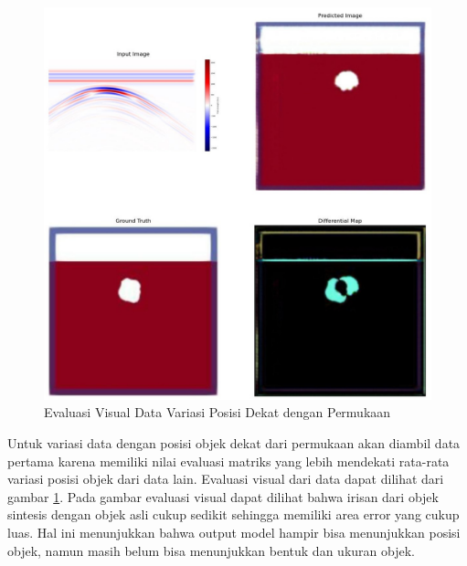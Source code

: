 \documentclass[conference]{IEEEtran}
\begin{document}
\begin{figure}[ht]
  \centering
  \includegraphics[scale=0.15]{gambar/diffMapDangkal.jpg}
  \caption{Evaluasi Visual Data Variasi Posisi Dekat dengan Permukaan}
  \label{fig:diffmapdangkal}
\end{figure}

Untuk variasi data dengan posisi objek dekat dari permukaan akan diambil data pertama karena memiliki nilai evaluasi matriks yang lebih mendekati rata-rata variasi posisi objek dari data lain. 
Evaluasi visual dari data dapat dilihat dari gambar \ref{fig:diffmapdangkal}. 
Pada gambar evaluasi visual dapat dilihat bahwa irisan dari objek sintesis dengan objek asli cukup sedikit sehingga memiliki area error yang cukup luas. 
Hal ini menunjukkan bahwa output model hampir bisa menunjukkan posisi objek, namun masih belum bisa menunjukkan bentuk dan ukuran objek.
\end{document}
